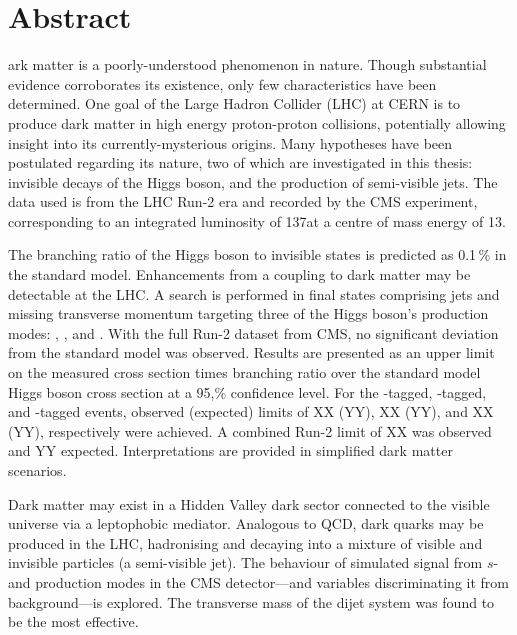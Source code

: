 %
%
%

\chapter*{Abstract}
\begin{SingleSpace}
ark matter is a poorly-understood phenomenon in nature. Though substantial evidence corroborates its existence, only few characteristics have been determined. One goal of the Large Hadron Collider (LHC) at CERN is to produce dark matter in high energy proton-proton collisions, potentially allowing insight into its currently-mysterious origins. Many hypotheses have been postulated regarding its nature, two of which are investigated in this thesis: invisible decays of the Higgs boson, and the production of semi-visible jets. The data used is from the LHC Run-2 era and recorded by the CMS experiment, corresponding to an integrated luminosity of 137\fbinv at a centre of mass energy of 13\TeV.

The branching ratio of the Higgs boson to invisible states is predicted as 0.1\,\% in the standard model. Enhancements from a coupling to dark matter may be detectable at the LHC. A search is performed in final states comprising jets and missing transverse momentum targeting three of the Higgs boson's production modes: \ttH, \VH, and \ggH. With the full Run-2 dataset from CMS, no significant deviation from the standard model was observed. Results are presented as an upper limit on the measured cross section times branching ratio over the standard model Higgs boson cross section at a 95,\% confidence level. For the \ttH-tagged, \VH-tagged, and \ggH-tagged events, observed (expected) limits of XX (YY), XX (YY), and XX (YY), respectively were achieved. A combined Run-2 limit of XX was observed and YY expected. Interpretations are provided in simplified dark matter scenarios.

Dark matter may exist in a Hidden Valley dark sector connected to the visible universe via a leptophobic mediator. Analogous to QCD, dark quarks may be produced in the LHC, hadronising and decaying into a mixture of visible and invisible particles (a semi-visible jet). The behaviour of simulated signal from $s$- and \tchannel production modes in the CMS detector---and variables discriminating it from background---is explored. The transverse mass of the dijet system was found to be the most effective.
\end{SingleSpace}
\clearpage
